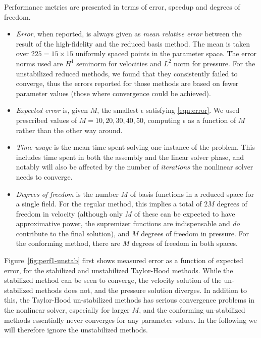 \documentclass[onecolumn, twoside, a4paper, 11pt]{article}
\begin{document}
Performance metrics are presented in terms of error, speedup and degrees of
freedom.
\begin{itemize}
  \item \emph{Error}, when reported, is always given as
    \emph{mean relative error} between the result of the high-fidelity and the
    reduced basis method. The mean is taken over $225 = 15 \times 15$ uniformly
    spaced points in the parameter space. The error norms used are $H^1$
    seminorm for velocities and $L^2$ norm for pressure. For the
    unstabilized reduced methods, we found that they consistently failed to
    converge, thus the errors reported for those methods are based on fewer
    parameter values (those where convergence could be achieved).
  \item \emph{Expected error} is, given $M$, the smallest $\epsilon$ satisfying
    \eqref{eqn:error}. We used prescribed values of $M=10,20,30,40,50$,
    computing $\epsilon$ as a function of $M$ rather than the other way around.
  \item \emph{Time usage} is the mean time spent solving one instance of the problem. This includes
    time spent in both the assembly and the linear solver phase, and notably will also be affected
    by the number of \emph{iterations} the nonlinear solver needs to converge.
  \item \emph{Degrees of freedom} is the number $M$ of basis functions in a reduced space for a
    single field. For the regular method, this implies a total of $2M$ degrees of freedom in
    velocity (although only $M$ of these can be expected to have approximative power, the supremizer
    functions are indispensable and \emph{do} contribute to the final solution), and $M$ degrees of
    freedom in pressure.  For the conforming method, there are $M$ degrees of freedom in both
    spaces.
\end{itemize}

Figure~\ref{fig:perf1-unstab} first shows measured error as a function of expected error, for the
stabilized and unstabilized Taylor-Hood methods. While the stabilized method can be seen to
converge, the velocity solution of the un-stabilized methods does not, and the pressure solution
diverges. In addition to this, the Taylor-Hood un-stabilized methods has serious convergence
problems in the nonlinear solver, especially for larger $M$, and the conforming un-stabilized
methods essentially never converges for any parameter values. In the following we will therefore
ignore the unstabilized methods.
\end{document}
